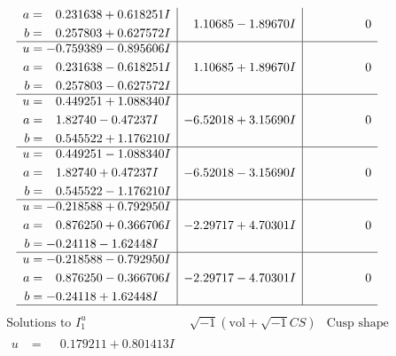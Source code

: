\documentclass[1p]{elsarticle_modified}
\theoremstyle{definition}
\newcommand{\I}{\sqrt{-1}}
\begin{document}
$$\begin{array}{c|c|c}
\begin{aligned}
a &= \phantom{-}0.231638 + 0.618251 I \\
b &= \phantom{-}0.257803 + 0.627572 I\end{aligned}
 & \phantom{-}1.10685 - 1.89670 I & \phantom{-0.000000 } 0 \\ \hline\begin{aligned}
u &= -0.759389 - 0.895606 I \\
a &= \phantom{-}0.231638 - 0.618251 I \\
b &= \phantom{-}0.257803 - 0.627572 I\end{aligned}
 & \phantom{-}1.10685 + 1.89670 I & \phantom{-0.000000 } 0 \\ \hline\begin{aligned}
u &= \phantom{-}0.449251 + 1.088340 I \\
a &= \phantom{-}1.82740 - 0.47237 I \\
b &= \phantom{-}0.545522 + 1.176210 I\end{aligned}
 & -6.52018 + 3.15690 I & \phantom{-0.000000 } 0 \\ \hline\begin{aligned}
u &= \phantom{-}0.449251 - 1.088340 I \\
a &= \phantom{-}1.82740 + 0.47237 I \\
b &= \phantom{-}0.545522 - 1.176210 I\end{aligned}
 & -6.52018 - 3.15690 I & \phantom{-0.000000 } 0 \\ \hline\begin{aligned}
u &= -0.218588 + 0.792950 I \\
a &= \phantom{-}0.876250 + 0.366706 I \\
b &= -0.24118 - 1.62448 I\end{aligned}
 & -2.29717 + 4.70301 I & \phantom{-0.000000 } 0 \\ \hline\begin{aligned}
u &= -0.218588 - 0.792950 I \\
a &= \phantom{-}0.876250 - 0.366706 I \\
b &= -0.24118 + 1.62448 I\end{aligned}
 & -2.29717 - 4.70301 I & \phantom{-0.000000 } 0\\
 \hline 
 \end{array}$$\newpage$$\begin{array}{c|c|c}  
\text{Solutions to }I^u_{1}& \I (\text{vol} + \sqrt{-1}CS) & \text{Cusp shape}\\
 \hline 
\begin{aligned}
u &= \phantom{-}0.179211 + 0.801413 I \\

\end{aligned}
\end{array}$$
\end{document}
